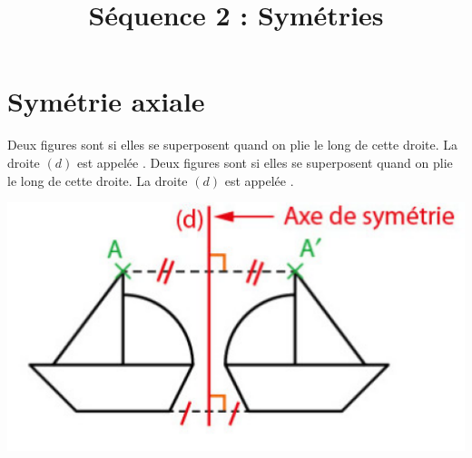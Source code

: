 \documentclass[xcolor={dvipsnames}]{beamer}
\title{Séquence 2 : Symétries}
\begin{document}
\begin{frame}
  \titlepage 
\end{frame}


	



\section{Symétrie axiale}




\begin{frame}{}
	\begin{mydef}
		Deux figures sont  si elles se superposent quand on plie le long de cette droite. 
		La droite $(d)$ est appelée .
		Deux figures sont  si elles se superposent quand on plie le long de cette droite. 
		La droite $(d)$ est appelée .\pause
	
	\end{mydef}

	\begin{myex}
		\begin{center}
			\includegraphics[scale=.5]{fig1}
		\end{center}	
	\end{myex}


\end{frame}
\end{document}
